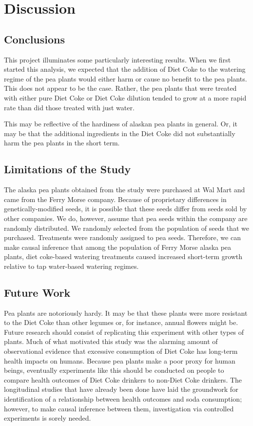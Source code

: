 \documentclass[1p,12pt]{elsarticle}\usepackage[]{graphicx}\usepackage[]{color}
\begin{document}
\section{Discussion}

\subsection{Conclusions}
This project illuminates some particularly interesting results. When we first started this analysis, we expected that the addition of Diet Coke to the watering regime of the pea plants would either harm or cause no benefit to the pea plants. This does not appear to be the case. Rather, the pea plants that were treated with either pure Diet Coke or Diet Coke dilution tended to grow at a more rapid rate than did those treated with just water. 

This may be reflective of the hardiness of alaskan pea plants in general. Or, it may be that the additional ingredients in the Diet Coke did not substantially harm the pea plants in the short term. 

\subsection{Limitations of the Study}

The alaska pea plants obtained from the study were purchased at Wal Mart and came from the Ferry Morse company. Because of proprietary differences in genetically-modified seeds, it is possible that these seeds differ from seeds sold by other companies. We do, however, assume that pea seeds within the company are randomly distributed. We randomly selected from the population of seeds that we purchased.  Treatments were randomly assigned to pea seeds. Therefore, we can make causal inference that among the population of Ferry Morse alaska pea plants, diet coke-based watering treatments caused  increased short-term growth relative to tap water-based watering regimes. 



\subsection{Future Work}
Pea plants are notoriously hardy. It may be that these plants were more resistant to the Diet Coke than other legumes or, for instance, annual flowers might be. Future research should consist of replicating this experiment with other types of plants.  Much of what motivated this study was the alarming amount of observational evidence that excessive consumption of Diet Coke has long-term health impacts on humans. Because pea plants make a poor proxy for human beings, eventually experiments like this should be conducted on people to compare health outcomes of Diet Coke drinkers to non-Diet Coke drinkers. The longitudinal studies that have already been done have laid the groundwork for identification of a relationship between health outcomes and soda consumption; however, to make causal inference between them, investigation via controlled experiments is sorely needed. 
\end{document}
